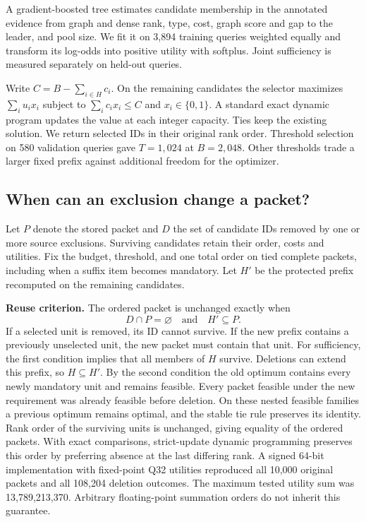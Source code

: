 \documentclass[conference]{IEEEtran}
\begin{document}
A gradient-boosted tree estimates candidate membership in the annotated evidence from graph and dense rank, type, cost, graph score and gap to the leader, and pool size. We fit it on 3,894 training queries weighted equally and transform its log-odds into positive utility with softplus. Joint sufficiency is measured separately on held-out queries.

Write $C=B-\sum_{i\in H} c_i$. On the remaining candidates the selector maximizes $\sum_i u_i x_i$ subject to $\sum_i c_i x_i\leq C$ and $x_i\in\{0,1\}$. A standard exact dynamic program updates the value at each integer capacity. Ties keep the existing solution. We return selected IDs in their original rank order. Threshold selection on 580 validation queries gave $T=1,024$ at $B=2,048$. Other thresholds trade a larger fixed prefix against additional freedom for the optimizer. 

\subsection{When can an exclusion change a packet?}
Let $P$ denote the stored packet and $D$ the set of candidate IDs removed by one or more source exclusions. Surviving candidates retain their order, costs and utilities. Fix the budget, threshold, and one total order on tied complete packets, including when a suffix item becomes mandatory. Let $H'$ be the protected prefix recomputed on the remaining candidates.

\textbf{Reuse criterion.} The ordered packet is unchanged exactly when
\[
           D\cap P=\varnothing \quad\text{and}\quad H'\subseteq P.
\]
If a selected unit is removed, its ID cannot survive. If the new prefix contains a previously unselected unit, the new packet must contain that unit. For sufficiency, the first condition implies that all members of $H$ survive. Deletions can extend this prefix, so $H\subseteq H'$. By the second condition the old optimum contains every newly mandatory unit and remains feasible. Every packet feasible under the new requirement was already feasible before deletion. On these nested feasible families a previous optimum remains optimal, and the stable tie rule preserves its identity. Rank order of the surviving units is unchanged, giving equality of the ordered packets. With exact comparisons, strict-update dynamic programming preserves this order by preferring absence at the last differing rank. A signed 64-bit implementation with fixed-point Q32 utilities reproduced all 10,000 original packets and all 108,204 deletion outcomes. The maximum tested utility sum was 13,789,213,370. Arbitrary floating-point summation orders do not inherit this guarantee.
\end{document}
